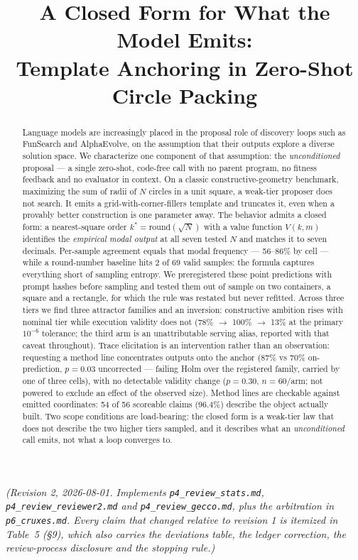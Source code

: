 \documentclass[11pt]{article}
\title{A Closed Form for What the Model Emits:\\ Template Anchoring in Zero-Shot Circle Packing}
\author{}
\date{}
\begin{document}
\maketitle

\begin{center}
\begin{minipage}{0.92\linewidth}
\small\itshape
(Revision 2, 2026-08-01. Implements \texttt{p4\_review\_stats.md}, \texttt{p4\_review\_reviewer2.md} and
\texttt{p4\_review\_gecco.md}, plus the arbitration in \texttt{p6\_cruxes.md}. Every claim that changed relative
to revision 1 is itemized in Table~5 (\S9), which also carries the deviations table, the ledger
correction, the review-process disclosure and the stopping rule.)
\end{minipage}
\end{center}

\begin{abstract}
Language models are increasingly placed in the proposal role of discovery loops such as
FunSearch and AlphaEvolve, on the assumption that their outputs explore a diverse solution
space. We characterize one component of that assumption: the \textit{unconditioned} proposal --- a
single zero-shot, code-free call with no parent program, no fitness feedback and no evaluator
in context. On a classic constructive-geometry benchmark, maximizing the sum of radii of $N$
circles in a unit square, a weak-tier proposer does not search. It emits a
grid-with-corner-fillers template and truncates it, even when a provably better construction is
one parameter away. The behavior admits a closed form: a nearest-square order $k^{*} = \mathrm{round}(\sqrt{N})$
with a value function $V(k, m)$ identifies the \textit{empirical modal output} at all seven tested $N$ and
matches it to seven decimals. Per-sample agreement equals that modal frequency --- 56--86\% by
cell --- while a round-number baseline hits 2 of 69 valid samples: the formula captures
everything short of sampling entropy. We preregistered these point predictions with prompt
hashes before sampling and tested them out of sample on two containers, a square and a
rectangle, for which the rule was restated but never refitted. Across three tiers we find three
attractor families and an inversion: constructive ambition rises with nominal tier while
execution validity does not (78\% $\rightarrow$ 100\% $\rightarrow$ 13\% at the primary $10^{-6}$ tolerance; the third arm is
an unattributable serving alias, reported with that caveat throughout). Trace elicitation is an
intervention rather than an observation: requesting a method line concentrates outputs onto the
anchor (87\% vs 70\% on-prediction, $p = 0.03$ uncorrected --- failing Holm over the registered
family, carried by one of three cells), with no detectable validity change ($p = 0.30$,
$n = 60$/arm; not powered to exclude an effect of the observed size). Method lines are checkable
against emitted coordinates: 54 of 56 scoreable claims (96.4\%) describe the object actually
built. Two scope conditions are load-bearing: the closed form is a weak-tier law that does not
describe the two higher tiers sampled, and it describes what an \textit{unconditioned} call emits, not
what a loop converges to.
\end{abstract}
\end{document}
